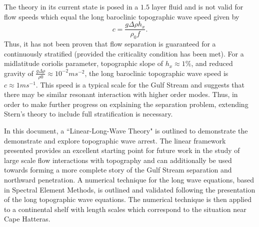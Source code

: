 \documentclass[12pt]{workjournal}
\begin{document}
The theory in its current state is posed in a $1.5$ layer fluid and is not valid for flow speeds which equal the long baroclinic topographic wave speed given by
 \begin{equation}
 c = \frac{g\Delta \rho h_x}{\rho_0 f}.
 \end{equation}
 Thus, it has not been proven that flow separation is guaranteed for a continuously stratified (provided the criticality condition has been met). For a midlatitude coriolis parameter, topographic slope of $h_x \approx 1 \%$, and reduced gravity of $\frac{g\Delta \rho}{\rho0}\approx 10^{-2}m s^{-2}$, the long baroclinic topographic wave speed is $c \approx 1 m s^{-1}$. This speed is a typical scale for the Gulf Stream and suggests that there may be similar resonant interaction with higher order modes. Thus, in order to make further progress on explaining the separation problem, extending Stern's theory to include full stratification is necessary.  

In this document, a ``Linear-Long-Wave Theory" is outlined to demonstrate the demonstrate and explore topographic wave arrest. The linear framework presented provides an excellent starting point for future work in the study of large scale flow interactions with topography and can additionally be used towards forming a more complete story of the Gulf Stream separation and northward penetration. A numerical technique for the long wave equations, based in Spectral Element Methods, is outlined and validated following the presentation of the long topographic wave equations. The numerical technique is then applied to a continental shelf with length scales which correspond to the situation near Cape Hatteras. 
\end{document}
